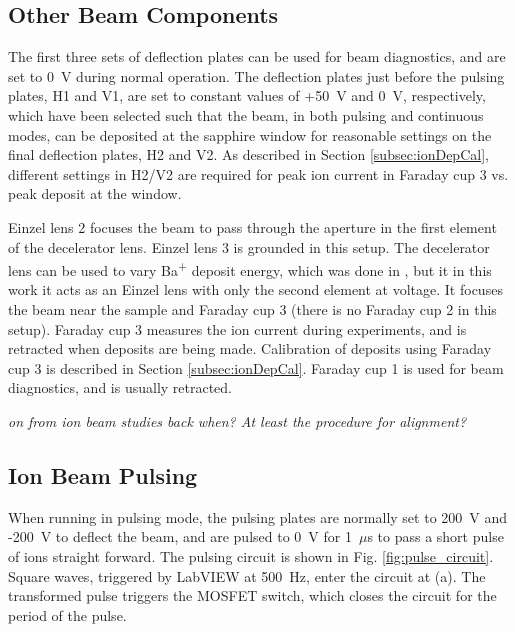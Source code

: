 \subsection{Other Beam Components}

The first three sets of deflection plates can be used for beam diagnostics, and are set to 0~V during normal operation.  The deflection plates just before the pulsing plates, H1 and V1, are set to constant values of +50~V and 0~V, respectively, which have been selected such that the beam, in both pulsing and continuous modes, can be deposited at the sapphire window for reasonable settings on the final deflection plates, H2 and V2.  As described in Section \ref{subsec:ionDepCal}, different settings in H2/V2 are required for peak ion current in Faraday cup 3 vs. peak deposit at the window.

Einzel lens 2 focuses the beam to pass through the aperture in the first element of the decelerator lens.  Einzel lens 3 is grounded in this setup.  The decelerator lens can be used to vary Ba\textsuperscript{+} deposit energy, which was done in \cite{Shon}, but it in this work it acts as an Einzel lens with only the second element at voltage.  It focuses the beam near the sample and Faraday cup 3 (there is no Faraday cup 2 in this setup).  Faraday cup 3 measures the ion current during experiments, and is retracted when deposits are being made.  Calibration of deposits using Faraday cup 3 is described in Section \ref{subsec:ionDepCal}.  Faraday cup 1 is used for beam diagnostics, and is usually retracted.  

\emph{\color{gray}on from ion beam studies back when?  At least the procedure for alignment?}

\subsection{Ion Beam Pulsing}

When running in pulsing mode, the pulsing plates are normally set to 200~V and -200~V to deflect the beam, and are pulsed to 0~V for 1~$\mu$s to pass a short pulse of ions straight forward.  The pulsing circuit is shown in Fig. \ref{fig:pulse_circuit}.  Square waves, triggered by LabVIEW at 500~Hz, enter the circuit at (a). The transformed pulse triggers the MOSFET switch, which closes the circuit for the period of the pulse.

